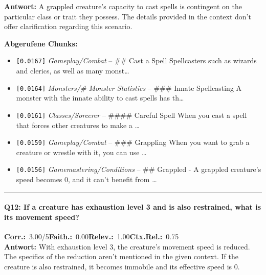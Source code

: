 \noindent\textbf{Antwort:} A grappled creature's capacity to cast spells is contingent on the particular class or trait they possess. The details provided in the context don't offer clarification regarding this scenario.

\noindent\textbf{Abgerufene Chunks:}
\begin{itemize}[noitemsep, topsep=2pt]
  \item[\textbf{\#1}] \texttt{[0.0167]} \textit{Gameplay/Combat} -- \#\# Cast a Spell  Spellcasters such as wizards and clerics, as well as many monst\ldots
  \item[\textbf{\#2}] \texttt{[0.0164]} \textit{Monsters/# Monster Statistics} -- \#\#\# Innate Spellcasting  A monster with the innate ability to cast spells has th\ldots
  \item[\textbf{\#3}] \texttt{[0.0161]} \textit{Classes/Sorcerer} -- \#\#\#\# Careful Spell  When you cast a spell that forces other creatures to make a \ldots
  \item[\textbf{\#4}] \texttt{[0.0159]} \textit{Gameplay/Combat} -- \#\#\# Grappling  When you want to grab a creature or wrestle with it, you can use \ldots
  \item[\textbf{\#5}] \texttt{[0.0156]} \textit{Gamemastering/Conditions} -- \#\# Grappled  - A grappled creature's speed becomes 0, and it can't benefit from \ldots
\end{itemize}
\vspace{4pt}
\hrule
\vspace{6pt}

\paragraph{Q12: If a creature has exhaustion level 3 and is also restrained, what is its movement speed?}
\noindent \textbf{Corr.:}~3.00/5\quad \textbf{Faith.:}~0.00\quad \textbf{Relev.:}~1.00\quad \textbf{Ctx.Rel.:}~0.75\\

\noindent\textbf{Antwort:} With exhaustion level 3, the creature's movement speed is reduced. The specifics of the reduction aren't mentioned in the given context. If the creature is also restrained, it becomes immobile and its effective speed is 0.

